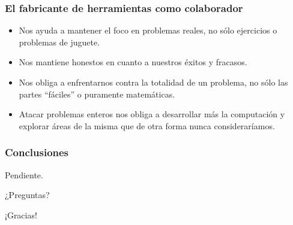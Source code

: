 \documentclass[spanish]{beamer}
\begin{document}
\begin{frame}
  \frametitle{El fabricante de herramientas como colaborador}

  \pause

  \begin{itemize}
    \item Nos ayuda a mantener el foco en problemas reales, no sólo ejercicios
      o problemas de juguete.

    \pause

    \item Nos mantiene honestos en cuanto a nuestros éxitos y fracasos.

    \pause

    \item Nos obliga a enfrentarnos contra la totalidad de un problema, no sólo
      las partes ``fáciles'' o puramente matemáticas.

    \pause

    \item Atacar problemas enteros nos obliga a desarrollar más la computación
      y explorar áreas de la misma que de otra forma nunca consideraríamos.
  \end{itemize}
\end{frame}

\begin{frame}
  \frametitle{Conclusiones}

  \pause

  Pendiente.
\end{frame}

\begin{frame}
  \begin{center}
    \Huge{¿Preguntas?}
  \end{center}
\end{frame}

\begin{frame}
  \begin{center}
    \Huge{¡Gracias!}
  \end{center}
\end{frame}
\end{document}
